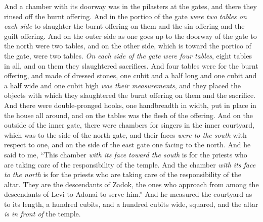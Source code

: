 \begin{biblechapter}
 And a chamber with its doorway was in the pilasters at the gates, and there they rinsed off the burnt offering.
\verse And in the portico of the gate \textit{were two tables on each side} to slaughter the burnt offering on them and the sin offering and the guilt offering.
\verse And on the outer side as one goes up to the doorway of the gate to the north were two tables, and on the other side, which is toward the portico of the gate, were two tables.
\verse \textit{On each side of the gate were four tables}, eight tables in all, and on them they slaughtered sacrifices.
\verse And four tables were for the burnt offering, and made of dressed stones, one cubit and a half long and one cubit and a half wide and one cubit high \textit{was their measurements}, and they placed the objects with which they slaughtered the burnt offering on them and the sacrifice.
\verse And there were double-pronged hooks, one handbreadth in width, put in place in the house all around, and on the tables was the flesh of the offering.
 And on the outside of the inner gate, there were chambers for singers in the inner courtyard, which was to the side of the north gate, and their faces \textit{were to the south} with respect to one, and on the side of the east gate one facing to the north.
\verse And he said to me, “This chamber \textit{with its face toward the south} is for the priests who are taking care of the responsibility of the temple.
\verse And the chamber \textit{with its face to the north} is for the priests who are taking care of the responsibility of the altar. They are the descendants of Zadok, the ones who approach from among the descendants of Levi to Adonai to serve him.”
 And he measured the courtyard as to its length, a hundred cubits, and a hundred cubits wide, squared, and the altar \textit{is in front of} the temple.

\end{biblechapter}
